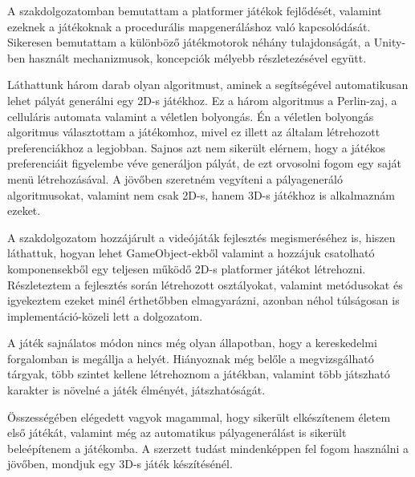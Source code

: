 
A szakdolgozatomban bemutattam a platformer játékok fejlődését, valamint ezeknek a játékoknak a procedurális mapgeneráláshoz való kapcsolódását. Sikeresen bemutattam a különböző játékmotorok néhány tulajdonságát, a Unity-ben használt mechanizmusok, koncepciók mélyebb részletezésével együtt. 

Láthattunk három darab olyan algoritmust, aminek a segítségével automatikusan lehet pályát generálni egy 2D-s játékhoz. Ez a három algoritmus a Perlin-zaj, a celluláris automata valamint a véletlen bolyongás. Én a véletlen bolyongás algoritmus választottam a játékomhoz, mivel ez illett az általam létrehozott preferenciákhoz a legjobban. Sajnos azt nem sikerült elérnem, hogy a játékos preferenciáit figyelembe véve generáljon pályát, de ezt orvosolni fogom egy saját menü létrehozásával. A jövőben szeretném vegyíteni a pályageneráló algoritmusokat, valamint nem csak 2D-s, hanem 3D-s játékhoz is alkalmaznám ezeket.

A szakdolgozatom hozzájárult a videójáták fejlesztés megismeréséhez is, hiszen láthattuk, hogyan lehet GameObject-ekből valamint a hozzájuk csatolható komponensekből egy teljesen működő 2D-s platformer játékot létrehozni. Részleteztem a fejlesztés során létrehozott osztályokat, valamint metódusokat és igyekeztem ezeket minél érthetőbben elmagyarázni, azonban néhol túlságosan is implementáció-közeli lett a dolgozatom.

A játék sajnálatos módon nincs még olyan állapotban, hogy a kereskedelmi forgalomban is megállja a helyét. Hiányoznak még belőle a megvizsgálható tárgyak, több szintet kellene létrehoznom a játékban, valamint több játszható karakter is növelné a játék élményét, játszhatóságát.

Összességében elégedett vagyok magammal, hogy sikerült elkészítenem életem első játékát, valamint még az automatikus pályagenerálást is sikerült beleépítenem a játékomba. A szerzett tudást mindenképpen fel fogom használni a jövőben, mondjuk egy 3D-s játék készítésénél.